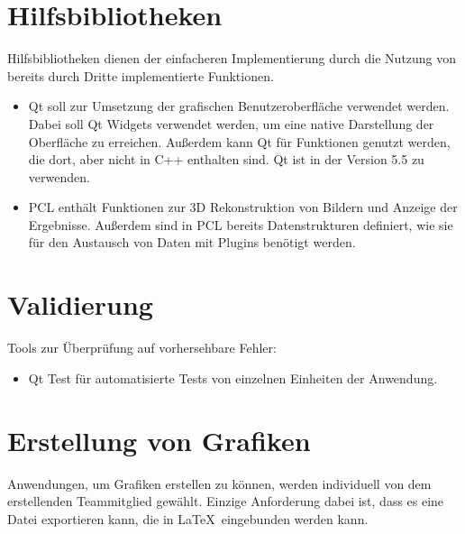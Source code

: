 \section{Hilfsbibliotheken}
	Hilfsbibliotheken dienen der einfacheren Implementierung durch die Nutzung von bereits durch Dritte implementierte Funktionen.
	\begin{itemize}
		\item Qt soll zur Umsetzung der grafischen Benutzeroberfläche verwendet werden. Dabei soll Qt Widgets verwendet werden, um eine native Darstellung der Oberfläche zu erreichen. Außerdem kann Qt für Funktionen genutzt werden, die dort, aber nicht in C++ enthalten sind. Qt ist in der Version 5.5 zu verwenden.
		\item PCL enthält Funktionen zur 3D Rekonstruktion von Bildern und Anzeige der Ergebnisse. Außerdem sind in PCL bereits Datenstrukturen definiert, wie sie für den Austausch von Daten mit Plugins benötigt werden.
	\end{itemize}
\section{Validierung}
	Tools zur Überprüfung auf vorhersehbare Fehler:
	\begin{itemize}
		\item Qt Test für automatisierte Tests von einzelnen Einheiten der Anwendung.
	\end{itemize}
\section{Erstellung von Grafiken}
	Anwendungen, um Grafiken erstellen zu können, werden individuell von dem erstellenden Teammitglied gewählt. Einzige Anforderung dabei ist, dass es eine Datei exportieren kann, die in \LaTeX\ eingebunden werden kann.
